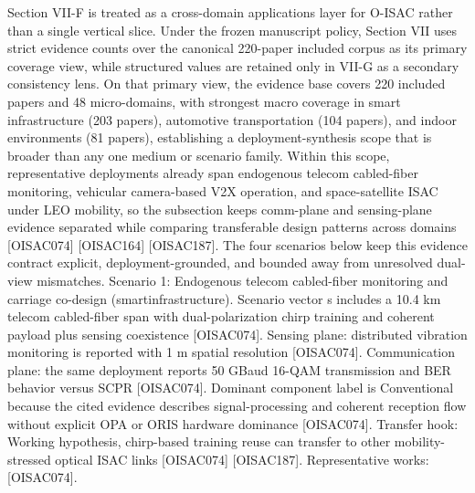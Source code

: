 {}Section VII-F is treated as a cross-domain applications layer for O-ISAC rather than a single vertical slice. Under the frozen manuscript policy, Section VII uses strict evidence counts over the canonical 220-paper included corpus as its primary coverage view, while structured  values are retained only in VII-G as a secondary consistency lens. On that primary view, the evidence base covers 220 included papers and 48 micro-domains, with strongest macro coverage in smart infrastructure (203 papers), automotive transportation (104 papers), and indoor environments (81 papers), establishing a deployment-synthesis scope that is broader than any one medium or scenario family. Within this scope, representative deployments already span endogenous telecom cabled-fiber monitoring, vehicular camera-based V2X operation, and space-satellite ISAC under LEO mobility, so the subsection keeps comm-plane and sensing-plane evidence separated while comparing transferable design patterns across domains [O\markdownRendererUnderscore{}ISAC\markdownRendererUnderscore{}074] [O\markdownRendererUnderscore{}ISAC\markdownRendererUnderscore{}164] [O\markdownRendererUnderscore{}ISAC\markdownRendererUnderscore{}187]. The four scenarios below keep this evidence contract explicit, deployment-grounded, and bounded away from unresolved dual-view mismatches.\markdownRendererInterblockSeparator
{}
\markdownRendererSectionEnd \markdownRendererSectionBegin
{}\markdownRendererInterblockSeparator
{}Scenario 1: Endogenous telecom cabled-fiber monitoring and carriage co-design (smart\markdownRendererUnderscore{}infrastructure).\markdownRendererHardLineBreak
{}Scenario vector s includes a 10.4 km telecom cabled-fiber span with dual-polarization chirp training and coherent payload plus sensing coexistence [O\markdownRendererUnderscore{}ISAC\markdownRendererUnderscore{}074]. Sensing plane: distributed vibration monitoring is reported with 1 m spatial resolution [O\markdownRendererUnderscore{}ISAC\markdownRendererUnderscore{}074]. Communication plane: the same deployment reports 50 GBaud 16-QAM transmission and BER behavior versus SCPR [O\markdownRendererUnderscore{}ISAC\markdownRendererUnderscore{}074]. Dominant component label is Conventional because the cited evidence describes signal-processing and coherent reception flow without explicit OPA or ORIS hardware dominance [O\markdownRendererUnderscore{}ISAC\markdownRendererUnderscore{}074]. Transfer hook: Working hypothesis, chirp-based training reuse can transfer to other mobility-stressed optical ISAC links [O\markdownRendererUnderscore{}ISAC\markdownRendererUnderscore{}074] [O\markdownRendererUnderscore{}ISAC\markdownRendererUnderscore{}187]. Representative works: [O\markdownRendererUnderscore{}ISAC\markdownRendererUnderscore{}074].\markdownRendererParagraphSeparator

